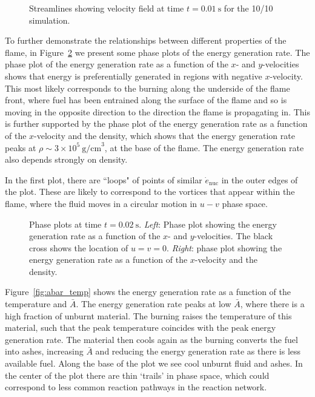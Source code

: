 \documentclass[preprint,times,tighten]{aastex63}
\begin{document}
\begin{figure}[t]
	\centering
	\caption{\label{fig:streamlines} Streamlines showing velocity field at time $t = 0.01~\mathrm{s}$ for the 10/10 simulation.}
\end{figure}

To further demonstrate the relationships between different properties
of the flame, in Figure~\ref{fig:phase_plots} we present some phase
plots of the energy generation rate. The phase plot of the energy
generation rate as a function of the $x$- and $y$-velocities shows
that energy is preferentially generated in regions with negative
$x$-velocity. This most likely corresponds to the burning along the
underside of the flame front, where fuel has been entrained along the
surface of the flame and so is moving in the opposite direction to the
direction the flame is propagating in. This is further supported by
the phase plot of the energy generation rate as a function of the
$x$-velocity and the density, which shows that the energy generation
rate peaks at $\rho \sim 3 \times 10^5~\mathrm{g/cm}^3$, at the base
of the flame.  The energy generation rate also depends strongly on density.

In the first plot, there are ``loops" of
points of similar $\dot{e}_\mathrm{nuc}$ in the outer edges of the plot.
These are likely to correspond to the vortices that appear within the flame,
where the fluid moves in a circular motion in $u-v$ phase space.

\begin{figure}[t]
\centering
{}
\caption{\label{fig:phase_plots} Phase plots at time $t = 0.02~\mathrm{s}$.
\emph{Left}: Phase plot showing the energy generation rate as a function of
the $x$- and $y$-velocities. The black cross shows the location of $u = v = 0$. \emph{Right}: phase plot showing the energy
generation rate as a function of the $x$-velocity and the density.}
\end{figure}

Figure~\ref{fig:abar_temp} shows the energy generation rate as a function of the
temperature and $\bar{A}$. 
The energy generation rate peaks at low $\bar{A}$, where there is a high fraction
of unburnt material. The burning raises the temperature of this material, such
that the peak temperature coincides with the peak energy generation rate. The
material then cools again as the burning converts the fuel into ashes,
increasing $\bar{A}$ and reducing the energy generation rate as there is
less available fuel. Along the base of the plot we see cool unburnt fluid and
ashes. In the center of the plot there are thin `trails' in phase space, which
could correspond to less common reaction pathways in the reaction network.
\end{document}
